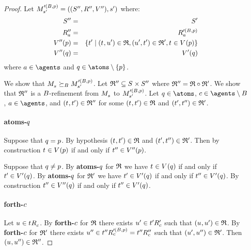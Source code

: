 \begin{proof}
Let $\kPModel[\prime(\agentsB, \atomP)]{\kStateSP} = \kPModelTuplePP{\kStateSP}$ where:
\begin{eqnarray*}
    \kStatesPP &=& \kStatesP\\
    \kAccessibilityPPA &=& \kAccessibilityA[\prime(\agentsB, \atomP)]\\
    \kValuationPP(\atomP) &=& \{\kStateTP \mid (\kStateT, \kStateUP) \in \bisimulation, (\kStateUP, \kStateTP) \in \refinement', \kStateT \in \kValuation(\atomP)\}\\
    \kValuationPP(\atomQ) &=& \kValuationP(\atomQ)
\end{eqnarray*}
where $\agentA \in \agents$ and $\atomQ \in \atoms \setminus \{\atomP\}$.

We show that $\kPModel{\kStateS} \simulatesBs \kPModel[\prime(\agentsB, \atomP)]{\kStateSP}$.
Let $\refinement'' \subseteq \kStates \times \kStatesPP$ where $\refinement'' = \bisimulation \circ \refinement'$.
We show that $\refinement''$ is a $\agentsB$-refinement from $\kPModel{\kStateS}$ to $\kPModel[\prime(\agentsB, \atomP)]{\kStateSP}$.
Let $\atomQ \in \atoms$, $\agentC \in \agents \setminus \agentsB$, $\agentA \in \agents$, and $(\kStateT, \kStateTP) \in \refinement''$ for some $(\kStateT, \kStateTP) \in \bisimulation$ and $(\kStateTP, \kStateTPP) \in \refinement'$.

\paragraph{atoms-$\atomQ$}
Suppose that $\atomQ = \atomP$.
By hypothesis $(\kStateT, \kStateTP) \in \bisimulation$ and $(\kStateTP, \kStateTPP) \in \refinement'$.
Then by construction $\kStateT \in \kValuation(\atomP)$ if and only if $\kStateTPP \in \kValuationPP(\atomP)$.

Suppose that $\atomQ \neq \atomP$.
By {\bf atoms-$\atomQ$} for $\bisimulation$ we have $\kStateT \in \kValuation(\atomQ)$ if and only if $\kStateTP \in \kValuationP(\atomQ)$.
By {\bf atoms-$\atomQ$} for $\refinement'$ we have $\kStateTP \in \kValuationP(\atomQ)$ if and only if $\kStateTPP \in \kValuationP(\atomQ)$.
By construction $\kStateTPP \in \kValuationPP(\atomQ)$ if and only if $\kStateTPP \in \kValuationP(\atomQ)$.

\paragraph{forth-$\agentC$}
Let $\kStateU \in \kSuccessorsC{\kStateT}$.
By {\bf forth-$\agentC$} for $\bisimulation$ there exists $\kStateUP \in \kSuccessorsPC{\kStateTP}$ such that $(\kStateU, \kStateUP) \in \bisimulation$.
By {\bf forth-$\agentC$} for $\refinement'$ there exists $\kStateUPP \in \kSuccessorsC[\prime(\agentsB, \atomP)]{\kStateTPP} = \kSuccessorsPPC{\kStateTPP}$ such that $(\kStateUP, \kStateUPP) \in \refinement'$.
Then $(\kStateU, \kStateUPP) \in \refinement''$.


\end{proof}
